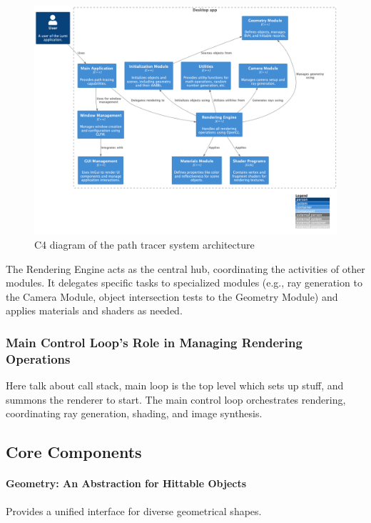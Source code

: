 \documentclass[12pt]{article}
\begin{document}
\begin{figure}[H]
    \centering
    \includegraphics[width=\textwidth]{images/lumi_pml.png}
    \caption{C4 diagram of the path tracer system architecture}
    \label{fig:c4-diagram}
\end{figure}

The Rendering Engine acts as the central hub, coordinating the activities of other modules. It delegates specific tasks to specialized modules (e.g., ray generation to the Camera Module, object intersection tests to the Geometry Module) and applies materials and shaders as needed.

\subsubsection{Main Control Loop's Role in Managing Rendering Operations}
Here talk about call stack, main loop is the top level which sets up stuff, and summons the renderer to start.
The main control loop orchestrates rendering, coordinating ray generation, shading, and image synthesis.

\subsection{Core Components}

\paragraph{Geometry: An Abstraction for Hittable Objects} Provides a unified interface for diverse geometrical shapes.
\end{document}
